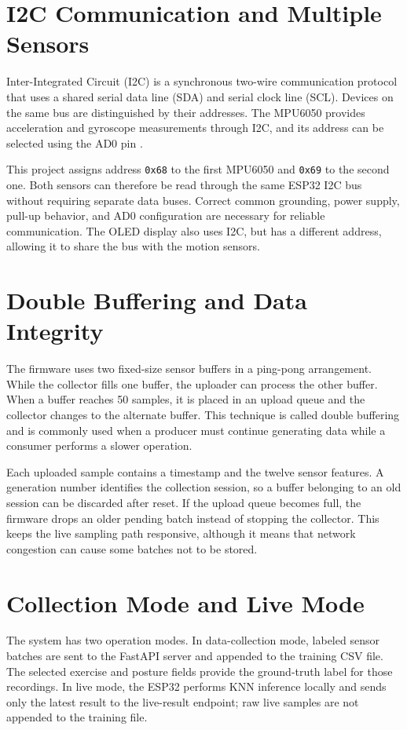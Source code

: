 \section{I2C Communication and Multiple Sensors}
Inter-Integrated Circuit (I2C) is a synchronous two-wire communication protocol that
uses a shared serial data line (SDA) and serial clock line (SCL). Devices on the same
bus are distinguished by their addresses. The MPU6050 provides acceleration and
gyroscope measurements through I2C, and its address can be selected using the AD0
pin \cite{invensense2013mpu6050}.

This project assigns address \texttt{0x68} to the first MPU6050 and \texttt{0x69} to
the second one. Both sensors can therefore be read through the same ESP32 I2C bus
without requiring separate data buses. Correct common grounding, power supply,
pull-up behavior, and AD0 configuration are necessary for reliable communication.
The OLED display also uses I2C, but has a different address, allowing it to share the
bus with the motion sensors.

\section{Double Buffering and Data Integrity}
The firmware uses two fixed-size sensor buffers in a ping-pong arrangement. While
the collector fills one buffer, the uploader can process the other buffer. When a
buffer reaches 50 samples, it is placed in an upload queue and the collector changes
to the alternate buffer. This technique is called double buffering and is commonly
used when a producer must continue generating data while a consumer performs a
slower operation.

Each uploaded sample contains a timestamp and the twelve sensor features. A
generation number identifies the collection session, so a buffer belonging to an
old session can be discarded after reset. If the upload queue becomes full, the
firmware drops an older pending batch instead of stopping the collector. This keeps
the live sampling path responsive, although it means that network congestion can
cause some batches not to be stored.

\section{Collection Mode and Live Mode}
The system has two operation modes. In data-collection mode, labeled sensor batches
are sent to the FastAPI server and appended to the training CSV file. The selected
exercise and posture fields provide the ground-truth label for those recordings. In
live mode, the ESP32 performs KNN inference locally and sends only the latest result
to the live-result endpoint; raw live samples are not appended to the training file.

